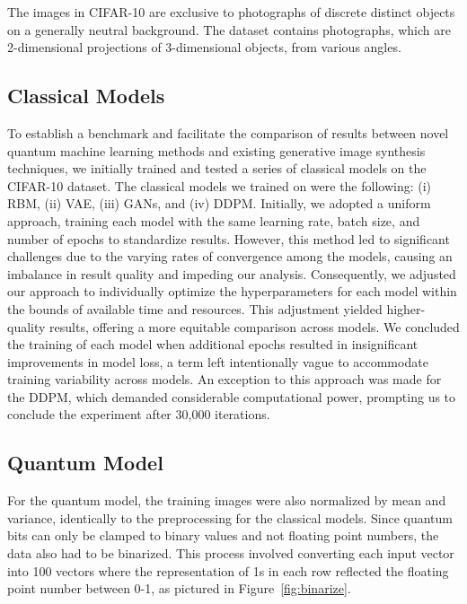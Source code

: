 \documentclass[%
 reprint,
 amsmath,amssymb,
 aps,
]{revtex4-2}
\begin{document}
The images in CIFAR-10 are exclusive to photographs of discrete distinct objects on a generally neutral background. The dataset contains photographs, which are 2-dimensional projections of 3-dimensional objects, from various angles.

\subsection{Classical Models}

To establish a benchmark and facilitate the comparison of results between novel quantum machine learning methods and existing generative image synthesis techniques, we initially trained and tested a series of classical models on the CIFAR-10 dataset. The classical models we trained on were the following: (i) RBM, (ii) VAE, (iii) GANs, and (iv) DDPM. Initially, we adopted a uniform approach, training each model with the same learning rate, batch size, and number of epochs to standardize results. However, this method led to significant challenges due to the varying rates of convergence among the models, causing an imbalance in result quality and impeding our analysis. Consequently, we adjusted our approach to individually optimize the hyperparameters for each model within the bounds of available time and resources. This adjustment yielded higher-quality results, offering a more equitable comparison across models. We concluded the training of each model when additional epochs resulted in insignificant improvements in model loss, a term left intentionally vague to accommodate training variability across models. An exception to this approach was made for the DDPM, which demanded considerable computational power, prompting us to conclude the experiment after 30,000 iterations.


\subsection{Quantum Model}
\label{binarize}
For the quantum model, the training images were also normalized by mean and variance, identically to the preprocessing for the classical models. Since quantum bits can only be clamped to binary values and not floating point numbers, the data also had to be binarized. This process involved converting each input vector into 100 vectors where the representation of 1s in each row reflected the floating point number between 0-1, as pictured in Figure~\ref{fig:binarize}.
\end{document}

